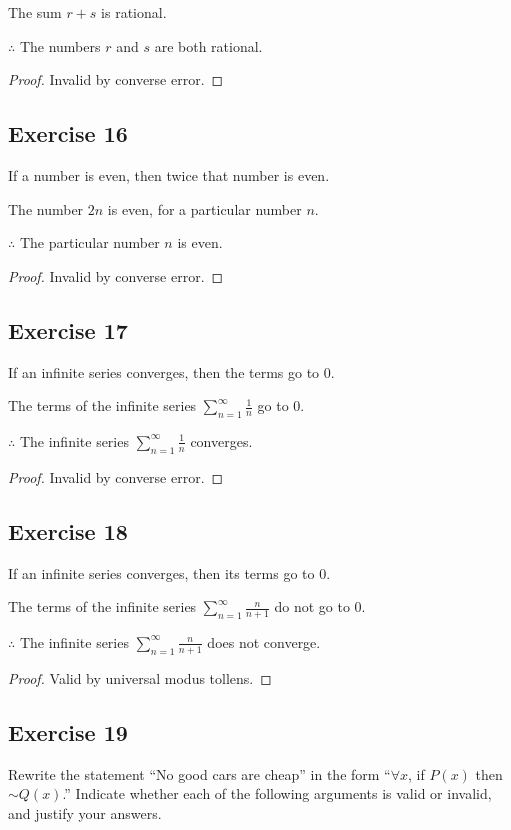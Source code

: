 \documentclass[14pt]{extarticle}
\newcommand{\dps}{\displaystyle}
\newcommand{\fa}{\forall}
\begin{document}
The sum $r + s$ is rational.

$\therefore$ The numbers $r$ and $s$ are both rational.

\begin{proof}
Invalid by converse error.
\end{proof}

\subsection{Exercise 16}
If a number is even, then twice that number is even.

The number $2n$ is even, for a particular number $n$.

$\therefore$ The particular number $n$ is even.

\begin{proof}
Invalid by converse error.
\end{proof}

\subsection{Exercise 17}
If an infinite series converges, then the terms go to 0.

The terms of the infinite series $\dps \sum_{n = 1}^{\infty} \frac{1}{n}$ go to 0.

$\therefore$ The infinite series $\dps \sum_{n = 1}^{\infty} \frac{1}{n}$ converges.

\begin{proof}
Invalid by converse error.
\end{proof}

\subsection{Exercise 18}
If an infinite series converges, then its terms go to 0.

The terms of the infinite series $\dps \sum_{n = 1}^{\infty} \frac{n}{n+1}$ do not go to 0.

$\therefore$ The infinite series $\dps \sum_{n = 1}^{\infty} \frac{n}{n+1}$ does not converge.

\begin{proof}
Valid by universal modus tollens.
\end{proof}

\subsection{Exercise 19}
Rewrite the statement “No good cars are cheap” in the form “$\fa x$, if $P(x)$ then $\sim Q(x)$.” Indicate whether each of the following arguments is valid or invalid, and justify your answers.
\end{document}
